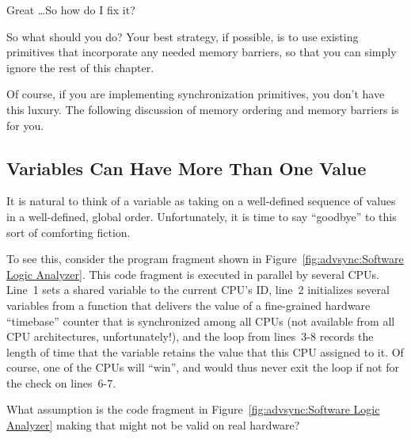 \QuickQuiz{}
	Great \ldots So how do I fix it?
 \QuickQuizEnd

So what should you do?
Your best strategy, if possible, is to use existing primitives that
incorporate any needed memory barriers, so that you can simply ignore
the rest of this chapter.

Of course, if you are implementing synchronization primitives,
you don't have this luxury.
The following discussion of memory ordering and memory barriers
is for you.

\subsection{Variables Can Have More Than One Value}
\label{sec:advsync:Variables Can Have More Than One Value}

It is natural to think of a variable as taking on a well-defined
sequence of values in a well-defined, global order.
Unfortunately, it is time to say ``goodbye'' to this sort of comforting
fiction.

To see this, consider the program fragment shown in
Figure~\ref{fig:advsync:Software Logic Analyzer}.
This code fragment is executed in parallel by several CPUs.
Line~1 sets a shared variable to the current CPU's ID, line~2
initializes several variables from a  function that
delivers the value of a fine-grained hardware ``timebase'' counter that is
synchronized among all CPUs (not available from all CPU architectures,
unfortunately!), and the loop from lines~3-8 records the length of
time that the variable retains the value that this CPU assigned to it.
Of course, one of the CPUs will ``win'', and would thus never exit
the loop if not for the check on lines~6-7.

\QuickQuiz{}
	What assumption is the code fragment
	in Figure~\ref{fig:advsync:Software Logic Analyzer}
	making that might not be valid on real hardware?
 \QuickQuizEnd

